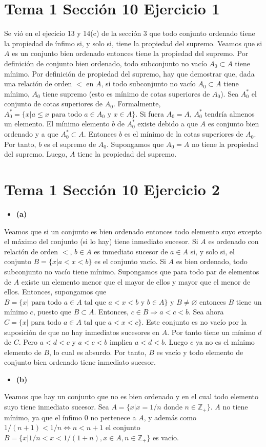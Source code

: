 \documentclass{article}
\begin{document}
\section{Tema 1 Sección 10 Ejercicio 1}
Se vió en el ejecicio 13 y 14(c) de la sección 3 que todo conjunto ordenado tiene la propiedad de ínfimo si, y solo si, tiene la propiedad del supremo.
Veamos que si $A$ es un conjunto bien ordenado entonces tiene la propiedad del supremo.
Por definición de conjunto bien ordenado, todo subconjunto no vacío $A_0\subset A$ tiene mínimo. Por definición de propiedad del supremo, hay que demostrar que, dada una relación de orden $<$ en $A$, si todo subconjunto no vacío $A_0\subset A$ tiene mínimo, $A_0$ tiene supremo (esto es mínimo de cotas superiores de $A_0$). Sea $A^*_0$ el conjunto de cotas superiores de $A_0$. Formalmente, $A^*_0=\{x| a \leq x\text{ para todo } a\in A_0 \text{ y }x\in A\}$. Si fuera $A_0=A$, $A^*_0$ tendría almenos un elemento. El mínimo elemento $b$ de $A^*_0$ existe debido a que $A$ es conjunto bien ordenado y a que $A^*_0\subset A$. Entonces $b$ es el mínimo de la cotas superiores de $A_0$. Por tanto, $b$ es el supremo de $A_0$. Supongamos que $A_0=A$ no tiene la propiedad del supremo.
Luego, $A$ tiene la propiedad del supremo. 
\section{Tema 1 Sección 10 Ejercicio 2}
\begin{itemize}
\item \bf (a) \rm
\end{itemize}
Veamos que si un conjunto es bien ordenado entonces todo elemento suyo excepto el máximo del conjunto (si lo hay) tiene inmediato sucesor. Si $A$ es ordenado con relación de orden $<$, $b\in A$ es inmediato sucesor de $a\in A$ si, y solo si, el conjunto $B=\{x| a<x<b\}$ es el conjunto vacío. Si $A$ es bien ordenado, todo subconjunto no vacío tiene mínimo. Supongamos que para todo par de elementos de  $A$ existe un elemento menor que el mayor de ellos y mayor que el menor de ellos. Entonces, supongamos que $B=\{x|\text{ para todo } a\in A \text{ tal que } a<x<b \text{ y } b\in A\}$ y $B\neq \varnothing$ entonces $B$ tiene un mínimo $c$, puesto que $B\subset A$. Entonces, $c\in B \Rightarrow a<c<b$. Sea ahora $C=\{x|\text{ para todo } a\in A \text{ tal que } a<x<c\}$. Este conjunto es no vacío por la suposición de que no hay inmediatos sucesores en $A$. Por tanto tiene un mínimo $d$ de $C$. Pero $a<d<c$ y $a<c<b$ implica $a<d<b$. Luego $c$ ya no es el mínimo elemento de $B$, lo cual es absurdo. Por tanto, $B$ es vacío y todo elemento de conjunto bien ordenado tiene inmediato sucesor.
\begin{itemize}
\item \bf (b) \rm
\end{itemize}
Veamos que hay un conjunto que no es bien ordenado y en el cual todo elemento suyo tiene inmediato sucesor. Sea $A=\{x|x=1/n \text{ donde }n\in \mathbb{Z}_{+}\}$. $A$ no tiene mínimo, ya que  el ínfimo $0$ no pertenece a $A$, y además como $1/(n+1)<1/n\Leftrightarrow n<n+1$ el conjunto $B=\{x|1/n<x<1/(1+n), x\in A, n\in\mathbb{Z}_{+}\}$ es vacío. 
\end{document}
